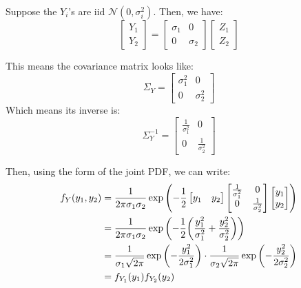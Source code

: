 \begin{example}
    Suppose the $Y_i$'s are iid $\mathcal{N}(0, \sigma_i^2)$. Then, we have:
    \[ \begin{bmatrix}
        Y_1 \\ Y_2
    \end{bmatrix} = \begin{bmatrix}
        \sigma_1 & 0 \\ 0 & \sigma_2
    \end{bmatrix} \begin{bmatrix}
        Z_1 \\ Z_2
    \end{bmatrix}\]

    This means the covariance matrix looks like:
    \[ \Sigma_Y = \begin{bmatrix}
        \sigma_1^2 & 0 \\ 0 & \sigma_2^2
    \end{bmatrix} \]
    Which means its inverse is:
    \[ \Sigma_Y^{-1} = \begin{bmatrix}
        \frac{1}{\sigma_1^2} & 0 \\ 0 & \frac{1}{\sigma_2^2}
    \end{bmatrix} \] 

    Then, using the form of the joint PDF, we can write:
    \begin{align*}
        f_Y(y_1, y_2) &= \frac{1}{2 \pi \sigma_1 \sigma_2} \exp\qty(-\frac12 \begin{bmatrix}
            y_1 & y_2
        \end{bmatrix} \begin{bmatrix}
            \frac{1}{\sigma_1^2} & 0 \\ 0 & \frac{1}{\sigma_2^2}
        \end{bmatrix} \begin{bmatrix}
            y_1 \\ y_2
        \end{bmatrix}) \\
        &=\frac{1}{2 \pi \sigma_1 \sigma_2} \exp\qty(-\frac12 \qty(\frac{y_1^2}{\sigma_1^2} + \frac{y_2^2}{\sigma_2^2})) \\
        &= \frac{1}{\sigma_1 \sqrt{2 \pi}}\exp\qty(-\frac{y_1^2}{2\sigma_1^2}) \cdot \frac{1}{\sigma_2 \sqrt{2 \pi}} \exp\qty(-\frac{y_2^2}{2\sigma_2^2})  \\
        &= f_{Y_1}(y_1) f_{Y_2}(y_2)
    \end{align*}
\end{example}

